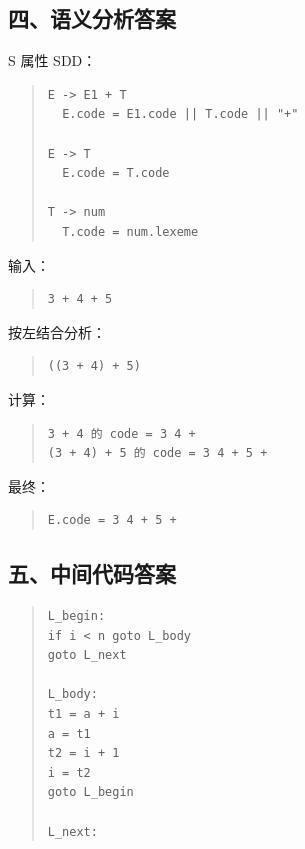 \documentclass[UTF8,zihao=-4]{ctexart}
\begin{document}
\subsection*{四、语义分析答案}

S 属性 SDD：

\begin{quote}
\footnotesize
\begin{verbatim}
E -> E1 + T
  E.code = E1.code || T.code || "+"

E -> T
  E.code = T.code

T -> num
  T.code = num.lexeme
\end{verbatim}
\end{quote}

输入：

\begin{quote}
\footnotesize
\begin{verbatim}
3 + 4 + 5
\end{verbatim}
\end{quote}

按左结合分析：

\begin{quote}
\footnotesize
\begin{verbatim}
((3 + 4) + 5)
\end{verbatim}
\end{quote}

计算：

\begin{quote}
\footnotesize
\begin{verbatim}
3 + 4 的 code = 3 4 +
(3 + 4) + 5 的 code = 3 4 + 5 +
\end{verbatim}
\end{quote}

最终：

\begin{quote}
\footnotesize
\begin{verbatim}
E.code = 3 4 + 5 +
\end{verbatim}
\end{quote}

\subsection*{五、中间代码答案}

\begin{quote}
\footnotesize
\begin{verbatim}
L_begin:
if i < n goto L_body
goto L_next

L_body:
t1 = a + i
a = t1
t2 = i + 1
i = t2
goto L_begin

L_next:
\end{verbatim}
\end{quote}
\end{document}
